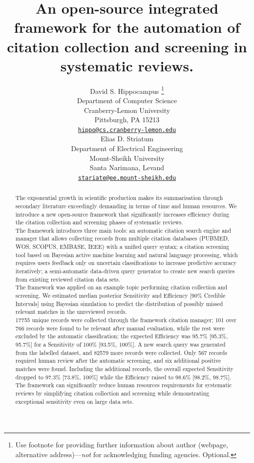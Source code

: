 \documentclass{article}
\title{An open-source integrated framework for the automation of
citation collection and screening in systematic reviews.}
\author{
    David S. Hippocampus
    \thanks{Use footnote for providing further information about author
(webpage, alternative address)---\emph{not} for acknowledging funding
agencies. Optional.}
   \\
    Department of Computer Science \\
    Cranberry-Lemon University \\
  Pittsburgh, PA 15213 \\
  \texttt{\href{mailto:hippo@cs.cranberry-lemon.edu}{\nolinkurl{hippo@cs.cranberry-lemon.edu}}} \\
   \And
    Elias D. Striatum
   \\
    Department of Electrical Engineering \\
    Mount-Sheikh University \\
  Santa Narimana, Levand \\
  \texttt{\href{mailto:stariate@ee.mount-sheikh.edu}{\nolinkurl{stariate@ee.mount-sheikh.edu}}} \\
  }
\begin{document}
\maketitle

\def\tightlist{}


\begin{abstract}
The exponential growth in scientific production makes its summarisation
through secondary literature exceedingly demanding in terms of time and
human resources. We introduce a new open-source framework that
significantly increases efficiency during the citation collection and
screening phases of systematic reviews.\\
The framework introduces three main tools: an automatic citation search
engine and manager that allows collecting records from multiple citation
databases (PUBMED, WOS, SCOPUS, EMBASE, IEEE) with a unified query
syntax; a citation screening tool based on Bayesian active machine
learning and natural language processing, which requires users feedback
only on uncertain classifications to increase predictive accuracy
iteratively; a semi-automatic data-driven query generator to create new
search queries from existing reviewed citation data sets.\\
The framework was applied on an example topic performing citation
collection and screening. We estimated median posterior Sensitivity and
Efficiency {[}90\% Credible Intervals{]} using Bayesian simulation to
predict the distribution of possibly missed relevant matches in the
unreviewed records.\\
17755 unique records were collected through the framework citation
manager; 101 over 766 records were found to be relevant after manual
evaluation, while the rest were excluded by the automatic
classification; the expected Efficiency was 95.7\% {[}95.3\%, 95.7\%{]}
for a Sensitivity of 100\% {[}93.5\%, 100\%{]}. A new search query was
generated from the labelled dataset, and 82579 more records were
collected. Only 567 records required human review after the automatic
screening, and six additional positive matches were found. Including the
additional records, the overall expected Sensitivity dropped to 97.3\%
{[}73.8\%, 100\%{]} while the Efficiency raised to 98.6\% {[}98.2\%,
98.7\%{]}.\\
The framework can significantly reduce human resources requirements for
systematic reviews by simplifying citation collection and screening
while demonstrating exceptional sensitivity even on large data sets.
\end{abstract}
\end{document}
